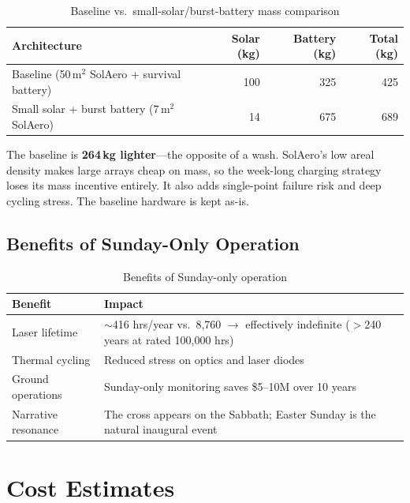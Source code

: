 \documentclass[10pt,letterpaper]{article}
\begin{document}
\begin{table}[!ht]
\centering\small
\caption{Baseline vs.\ small-solar/burst-battery mass comparison}
\label{tab:arch-comparison}
\begin{tabularx}{\linewidth}{Xrrr}
\toprule
\textbf{Architecture} & \textbf{Solar (kg)} & \textbf{Battery (kg)} & \textbf{Total (kg)} \\
\midrule
Baseline (50\,m$^2$ SolAero + survival battery) & 100 & 325 & 425 \\
Small solar + burst battery (7\,m$^2$ SolAero) & 14 & 675 & 689 \\
\bottomrule
\end{tabularx}
\end{table}

\noindent The baseline is \textbf{264\,kg lighter}---the opposite of a wash.
SolAero's low areal density makes large arrays cheap on mass, so the
week-long charging strategy loses its mass incentive entirely. It also adds
single-point failure risk and deep cycling stress. The baseline hardware is
kept as-is.

\subsection{Benefits of Sunday-Only Operation}

\begin{table}[!ht]
\centering\small
\caption{Benefits of Sunday-only operation}
\label{tab:sunday-benefits}
\begin{tabularx}{\linewidth}{lX}
\toprule
\textbf{Benefit} & \textbf{Impact} \\
\midrule
Laser lifetime & $\sim$416 hrs/year vs.\ 8{,}760 $\to$ effectively indefinite ($>$240 years at rated 100{,}000 hrs) \\
Thermal cycling & Reduced stress on optics and laser diodes \\
Ground operations & Sunday-only monitoring saves \$5--10M over 10 years \\
Narrative resonance & The cross appears on the Sabbath; Easter Sunday is the natural inaugural event \\
\bottomrule
\end{tabularx}
\end{table}

\section{Cost Estimates}
\end{document}
